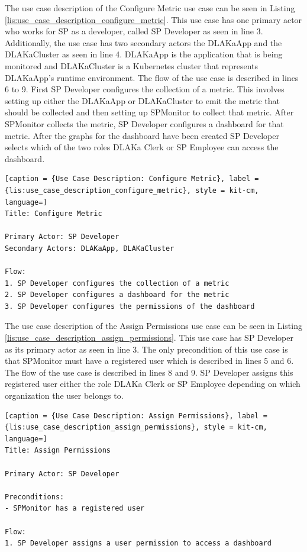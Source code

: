The use case description of the Configure Metric use case can be seen in
Listing \ref{lis:use_case_description_configure_metric}. This use case has one
primary actor who works for SP as a developer, called SP Developer as seen in line 3.
Additionally, the use case has two secondary actors the DLAKaApp and the
DLAKaCluster as seen in line 4. DLAKaApp is the application that is being monitored and
DLAKaCluster is a Kubernetes cluster that represents DLAKaApp's runtime
environment. The flow of the use case is described in lines 6 to 9.
First SP Developer configures the collection of a metric. This
involves setting up either the DLAKaApp or DLAKaCluster to emit the metric that
should be collected and then setting up SPMonitor to collect that metric. After
SPMonitor collects the metric, SP Developer configures a dashboard for that
metric. After the graphs for the dashboard have been created SP Developer
selects which of the two roles DLAKa Clerk or SP Employee can access the
dashboard.

\begin{lstlisting}[caption = {Use Case Description: Configure Metric}, label = {lis:use_case_description_configure_metric}, style = kit-cm, language=]
Title: Configure Metric

Primary Actor: SP Developer
Secondary Actors: DLAKaApp, DLAKaCluster

Flow:
1. SP Developer configures the collection of a metric
2. SP Developer configures a dashboard for the metric
3. SP Developer configures the permissions of the dashboard
\end{lstlisting}

The use case description of the Assign Permissions use case can be seen in
Listing \ref{lis:use_case_description_assign_permissions}. This use case has SP
Developer as its primary actor as seen in line 3. The only precondition of this use case is that SPMonitor must have a
registered user which is described in lines 5 and 6. 
The flow of the use case is described in lines 8 and 9.
SP Developer assigns this registered user either the role
DLAKa Clerk or SP Employee depending on which organization the user belongs to.

\begin{lstlisting}[caption = {Use Case Description: Assign Permissions}, label = {lis:use_case_description_assign_permissions}, style = kit-cm, language=]
Title: Assign Permissions

Primary Actor: SP Developer

Preconditions:
- SPMonitor has a registered user

Flow:
1. SP Developer assigns a user permission to access a dashboard
\end{lstlisting}

